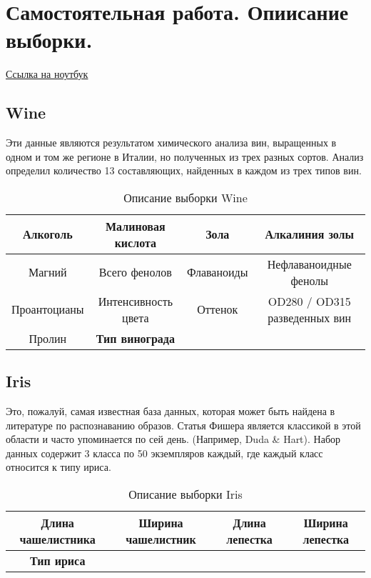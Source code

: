 \section{Самостоятельная работа. Опиисание выборки.}

\href{https://github.com/andriygav/School/blob/master/2018/AD/Lecture/Lecture6.ipynb}{Ссылка на ноутбук}

\subsection{Wine\cite{Wine}}
Эти данные являются результатом химического анализа вин, выращенных в одном и том же регионе в Италии, но полученных из трех разных сортов. Анализ определил количество 13 составляющих, найденных в каждом из трех типов вин.

\begin{table}[h]
\begin{center}
\caption{Описание выборки Wine}
\begin{tabular}{|c|c|c|c|}
\hline
Алкоголь&Малиновая кислота&Зола&Алкалиния золы\\
\hline
Магний&Всего фенолов&Флаваноиды&Нефлаваноидные фенолы\\
\hline
Проантоцианы&Интенсивность цвета&Оттенок&OD280 / OD315 разведенных вин\\
\hline
Пролин&\bf Тип винограда&&\\
\hline
\end{tabular}
\end{center}
\end{table}

\subsection{Iris\cite{Iris}}
Это, пожалуй, самая известная база данных, которая может быть найдена в литературе по распознаванию образов. Статья Фишера является классикой в этой области и часто упоминается по сей день. (Например, Duda \& Hart). Набор данных содержит 3 класса по 50 экземпляров каждый, где каждый класс относится к типу ириса.

\begin{table}[h]
\begin{center}
\caption{Описание выборки Iris}
\begin{tabular}{|c|c|c|c|}
\hline
Длина чашелистника &Ширина чашелистник&Длина лепестка&Ширина лепестка\\
\hline
\bf Тип ириса&&&\\
\hline
\end{tabular}
\end{center}
\end{table}

